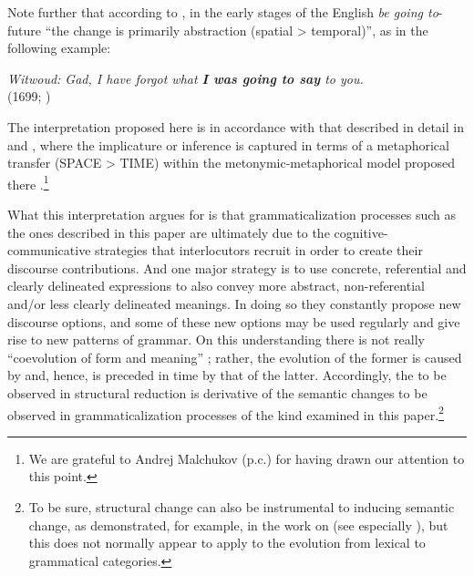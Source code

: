 \documentclass[output=paper]{langsci/langscibook}
\begin{document}
Note further that according to \citet[84]{TraugottDasher2002}, in the early stages of the English \textit{be going to}-future “the change is primarily abstraction (spatial > temporal)”, as in the following example:



\ea%
    \label{ex:heine:17}
          \textit{Witwoud: Gad, I have forgot what \textbf{I was going to say}  to you.}\\ 
    (1699; \citealt[84]{TraugottDasher2002})
\z



The interpretation proposed here is in accordance with that described in detail in \citet{HeineEtAl1991} and \citet{Heine1997}, where the implicature or inference is captured in terms of a metaphorical transfer (SPACE > TIME) within the metonymic-metaphorical model proposed there \citep[70, 113]{HeineEtAl1991}.\footnote{We are grateful to Andrej Malchukov (p.c.) for having drawn our attention to this point.} 



  What this interpretation argues for is that grammaticalization processes such as the ones described in this paper are ultimately due to the cognitive-communi\-cative strategies that interlocutors recruit in order to create their discourse contributions. And one major strategy is to use concrete, referential and clearly delineated expressions to also convey more abstract, non-referential and/or less clearly delineated meanings. In doing so they constantly propose new discourse options, and some of these new options may be used regularly and give rise to new patterns of grammar. On this understanding there is not really ``coevolution of form and meaning'' \citep[4]{BybeeEtAl1994}; rather, the evolution of the former is caused by and, hence, is preceded in time by that of the latter. Accordingly, the  to be observed in structural reduction is derivative of the semantic changes to be observed in grammaticalization processes of the kind examined in this paper.\footnote{To be sure, structural change can also be instrumental to inducing semantic change, as demonstrated, for example, in the work on  (see especially \citealt{Norde2009}), but this does not normally appear to apply to the evolution from lexical to grammatical categories.} 
\end{document}
